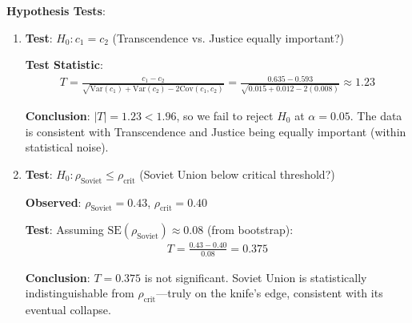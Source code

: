 \documentclass[11pt,a4paper]{article}
\theoremstyle{definition}
\theoremstyle{remark}
\begin{document}
\textbf{Hypothesis Tests}:

\begin{enumerate}
\item \textbf{Test}: \(H_0: c_1 = c_2\) (Transcendence vs. Justice equally important?)

\textbf{Test Statistic}:
\begin{align}
T = \frac{c_1 - c_2}{\sqrt{\text{Var}(c_1) + \text{Var}(c_2) - 2\text{Cov}(c_1, c_2)}} = \frac{0.635 - 0.593}{\sqrt{0.015 + 0.012 - 2(0.008)}} \approx 1.23
\end{align}

\textbf{Conclusion}: \(|T| = 1.23 < 1.96\), so we fail to reject \(H_0\) at \(\alpha = 0.05\). The data is consistent with Transcendence and Justice being equally important (within statistical noise).

\item \textbf{Test}: \(H_0: \rho_{\text{Soviet}} \leq \rho_{\text{crit}}\) (Soviet Union below critical threshold?)

\textbf{Observed}: \(\rho_{\text{Soviet}} = 0.43\), \(\rho_{\text{crit}} = 0.40\)

\textbf{Test}: Assuming \(\text{SE}(\rho_{\text{Soviet}}) \approx 0.08\) (from bootstrap):
\begin{align}
T = \frac{0.43 - 0.40}{0.08} = 0.375
\end{align}

\textbf{Conclusion}: \(T = 0.375\) is not significant. Soviet Union is statistically indistinguishable from \(\rho_{\text{crit}}\)—truly on the knife's edge, consistent with its eventual collapse.
\end{enumerate}
\end{document}
